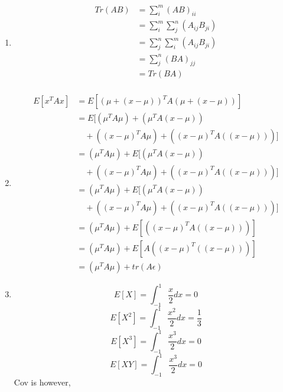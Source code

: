 \documentclass{article}
\begin{document}
\begin{enumerate}
\begin{enumerate}
        the fraction of variance preserved would be \(\lambda/41\approx 0.88\) where 41 is the trace of the cov matrix. 
    \end{enumerate}
    \item \begin{equation}
        \begin{split}
            Tr(AB)&= \sum_i^m(AB)_{ii}\\
            &= \sum_i^{m}\sum_j^n (A_{ij}B_{ji}) \\
            &= \sum_j^{n}\sum_i^m (A_{ij}B_{ji}) \\
            &= \sum_j^n(BA)_{jj}\\
            &= Tr(BA)\\
        \end{split}
    \end{equation}
    \item 
    \begin{equation}
        \begin{split}
            E[x^TAx]&=E[(\mu+(x-\mu))^TA(\mu+(x-\mu))]\\
            &= E[(\mu^TA\mu) + (\mu^TA(x-\mu)) \\
            &\quad+ ((x-\mu)^TA\mu) + ((x-\mu)^TA((x-\mu)))]\\
            &= (\mu^TA\mu) + E[(\mu^TA(x-\mu)) \\
            &\quad+ ((x-\mu)^TA\mu) + ((x-\mu)^TA((x-\mu)))]\\
            &= (\mu^TA\mu) + E[(\mu^TA(x-\mu)) \\
            &\quad+ ((x-\mu)^TA\mu) + ((x-\mu)^TA((x-\mu)))]\\
            &= (\mu^TA\mu) + E[((x-\mu)^TA((x-\mu)))]\\
            &= (\mu^TA\mu) + E[A((x-\mu)^T((x-\mu)))]\\
            &= (\mu^TA\mu) + tr(A\epsilon)
        \end{split}
    \end{equation}
    \item 

    \begin{equation}
        E[X]=\int_{-1}^1 \frac{x}{2} dx = 0
    \end{equation}
    \begin{equation}
        E[X^2]=\int_{-1}^1 \frac{x^2}{2} dx = \frac{1}{3}
    \end{equation}
    \begin{equation}
        E[X^3]=\int_{-1}^1 \frac{x^3}{2} dx = 0
    \end{equation}
    \begin{equation}
        E[XY]=\int_{-1}^1 \frac{x^3}{2} dx = 0
    \end{equation}
    Cov is however, 


\end{enumerate}
\end{document}
